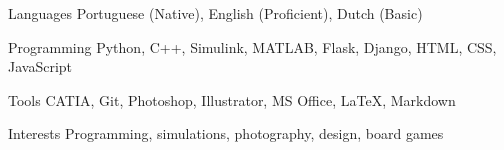 \begin{cvskills}

  \cvskill
    {Languages} %
    {Portuguese (Native), English (Proficient), Dutch (Basic)} %

  \cvskill
    {Programming} %
    {Python, C++, Simulink, MATLAB, Flask, Django, HTML, CSS, JavaScript} %

  \cvskill
    {Tools} %
    {CATIA, Git, Photoshop, Illustrator, MS Office, LaTeX, Markdown} %

  \cvskill
    {Interests} %
    {Programming, simulations, photography, design, board games} %

\end{cvskills}